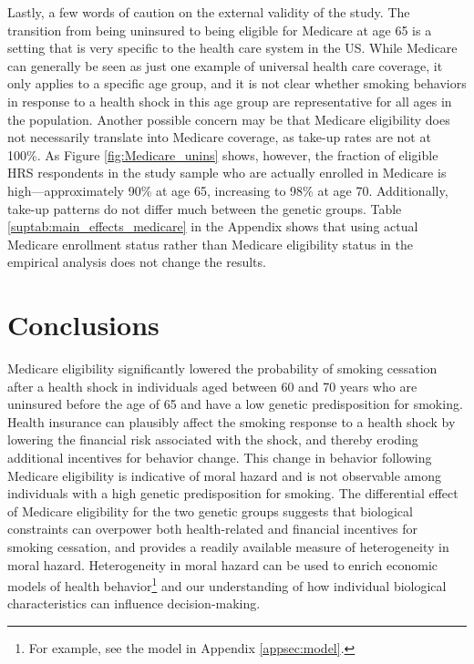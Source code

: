 \documentclass[11pt]{article}
\begin{document}
Lastly, a few words of caution on the external validity of the study.
The transition from being uninsured to being eligible for Medicare at age 65 is a setting that is very specific to the health care system in the US.
While Medicare can generally be seen as just one example of universal health care coverage, it only applies to a specific age group, and it is not clear whether smoking behaviors in response to a health shock in this age group are representative for all ages in the population.
Another possible concern may be that Medicare eligibility does not necessarily translate into Medicare coverage, as take-up rates are not at 100\%.
As Figure \ref{fig:Medicare_unins} shows, however, the fraction of eligible HRS respondents in the study sample who are actually enrolled in Medicare is high---approximately 90\% at age 65, increasing to 98\% at age 70.
Additionally, take-up patterns do not differ much between the genetic groups.
Table \ref{suptab:main_effects_medicare} in the Appendix shows that using actual Medicare enrollment status rather than Medicare eligibility status in the empirical analysis does not change the results.



\section{Conclusions}\label{sec:conclusion}

Medicare eligibility significantly lowered the probability of smoking cessation after a health shock in individuals aged between 60 and 70 years who are uninsured before the age of 65 and have a low genetic predisposition for smoking.
Health insurance can plausibly affect the smoking response to a health shock by lowering the financial risk associated with the shock, and thereby eroding additional incentives for behavior change.
This change in behavior following Medicare eligibility is indicative of moral hazard and is not observable among individuals with a high genetic predisposition for smoking.
The differential effect of Medicare eligibility for the two genetic groups suggests that biological constraints can overpower both health-related and financial incentives for smoking cessation, and provides a readily available measure of heterogeneity in moral hazard.
Heterogeneity in moral hazard can be used to enrich economic models of health behavior\footnote{For example, see the model in Appendix \ref{appsec:model}.} and our understanding of how individual biological characteristics can influence decision-making.
\end{document}
